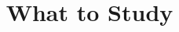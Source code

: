 \documentclass[11pt,twoside,a4paper]{article}
\begin{document}
\title{What to Study}

\end{document}
